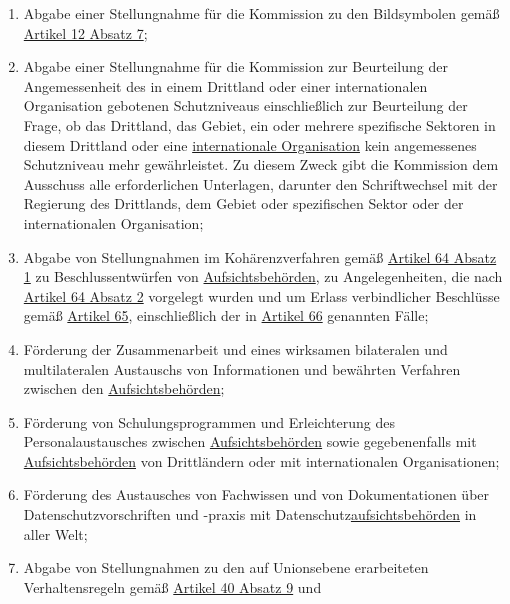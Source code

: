 \begin{enumerate}
\begin{enumerate}
    \item Abgabe einer Stellungnahme für die Kommission zu den Bildsymbolen gemäß \hyperref[itm:12-7]{Artikel 12 Absatz
     7};
    \label{itm:70-1r}

    \item Abgabe einer Stellungnahme für die Kommission zur Beurteilung der Angemessenheit des in einem Drittland oder
     einer internationalen Organisation gebotenen Schutzniveaus einschließlich zur Beurteilung der Frage, ob das
     Drittland, das Gebiet, ein oder mehrere spezifische Sektoren in diesem Drittland oder eine \hyperref[itm:04-29]
     {internationale Organisation} kein angemessenes Schutzniveau mehr gewährleistet. Zu diesem Zweck gibt die
     Kommission dem Ausschuss alle erforderlichen Unterlagen, darunter den Schriftwechsel mit der Regierung des
     Drittlands, dem Gebiet oder spezifischen Sektor oder der internationalen Organisation;
    \label{itm:70-1s}

    \item Abgabe von Stellungnahmen im Kohärenzverfahren gemäß \hyperref[itm:64-1]{Artikel 64 Absatz 1} zu
     Beschlussentwürfen von \hyperref[itm:04-21]{Aufsichtsbehörden}, zu Angelegenheiten, die nach \hyperref[itm:64-2]
     {Artikel 64 Absatz 2} vorgelegt wurden und um Erlass verbindlicher Beschlüsse gemäß \hyperref[ch:65]{Artikel 65},
     einschließlich der in \hyperref[ch:66]{Artikel 66} genannten Fälle;
    \label{itm:70-1t}

    \item Förderung der Zusammenarbeit und eines wirksamen bilateralen und multilateralen Austauschs von Informationen
     und bewährten Verfahren zwischen den \hyperref[itm:04-21]{Aufsichtsbehörden};
    \label{itm:70-1u}

    \item Förderung von Schulungsprogrammen und Erleichterung des Personalaustausches zwischen \hyperref[itm:04-21]
     {Aufsichtsbehörden} sowie gegebenenfalls mit \hyperref[itm:04-21]{Aufsichtsbehörden} von Drittländern oder mit
     internationalen Organisationen;
    \label{itm:70-1v}

    \item Förderung des Austausches von Fachwissen und von Dokumentationen über Datenschutzvorschriften und -praxis mit
     Datenschutz\hyperref[itm:04-21]{aufsichtsbehörden} in aller Welt;
    \label{itm:70-1w}

    \item Abgabe von Stellungnahmen zu den auf Unionsebene erarbeiteten Verhaltensregeln gemäß \hyperref[itm:40-9]
     {Artikel 40 Absatz 9} und
    \label{itm:70-1x}


\end{enumerate}
\end{enumerate}
